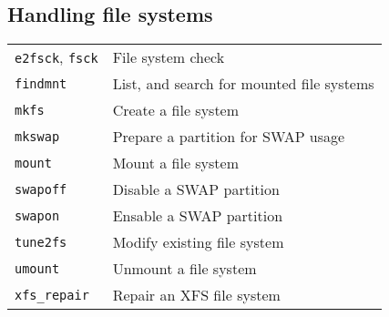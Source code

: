 \documentclass[10pt]{article}
\begin{document}
\newpage

\cheatsheet

\begin{multicols}{2} 
\section{Handling file systems}
\begin{tabular}{ p{2.5cm} p{8.5cm} }
  \hline
  \texttt{e2fsck}, \texttt{fsck} & File system check \\
  \texttt{findmnt} & List, and search for mounted file systems \\
  \texttt{mkfs} & Create a file system \\
  \texttt{mkswap} & Prepare a partition for SWAP usage \\
  \texttt{mount} & Mount a file system \\
  \texttt{swapoff} & Disable a SWAP partition \\
  \texttt{swapon} & Ensable a SWAP partition \\
  \texttt{tune2fs} & Modify existing file system \\
  \texttt{umount} & Unmount a file system\\
  \texttt{xfs\_repair} & Repair an XFS file system\\
  \hline
\end{tabular}

~\hfill


\end{multicols}
\end{document}

